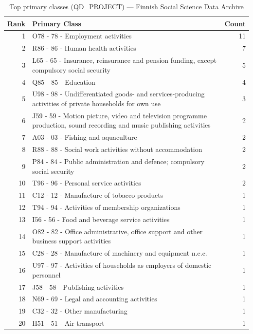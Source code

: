\begin{table}[H]
    \centering
    \begin{tabular}{r p{10cm} r}
    \hline
    \textbf{Rank} & \textbf{Primary Class} & \textbf{Count} \\
    \hline
    1 & O78 - 78 - Employment activities & 11 \\
    2 & R86 - 86 - Human health activities & 7 \\
    3 & L65 - 65 - Insurance, reinsurance and pension funding, except compulsory social security & 5 \\
    4 & Q85 - 85 - Education & 4 \\
    5 & U98 - 98 - Undifferentiated goods- and services-producing activities of private households for own use & 3 \\
    6 & J59 - 59 - Motion picture, video and television programme production, sound recording and music publishing activities & 2 \\
    7 & A03 - 03 - Fishing and aquaculture & 2 \\
    8 & R88 - 88 - Social work activities without accommodation & 2 \\
    9 & P84 - 84 - Public administration and defence; compulsory social security & 2 \\
    10 & T96 - 96 - Personal service activities & 2 \\
    11 & C12 - 12 - Manufacture of tobacco products & 1 \\
    12 & T94 - 94 - Activities of membership organizations & 1 \\
    13 & I56 - 56 - Food and beverage service activities & 1 \\
    14 & O82 - 82 - Office administrative, office support and other business support activities & 1 \\
    15 & C28 - 28 - Manufacture of machinery and equipment n.e.c. & 1 \\
    16 & U97 - 97 - Activities of households as employers of domestic personnel & 1 \\
    17 & J58 - 58 - Publishing activities & 1 \\
    18 & N69 - 69 - Legal and accounting activities & 1 \\
    19 & C32 - 32 - Other manufacturing & 1 \\
    20 & H51 - 51 - Air transport & 1 \\
    \hline
    \end{tabular}
    \caption{Top primary classes (QD\_PROJECT) --- Finnish Social Science Data Archive}
\end{table}

